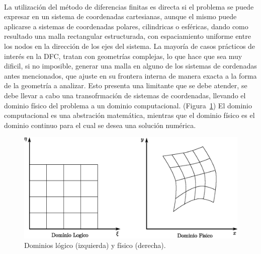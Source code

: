 \documentclass[letterpaper, openright, 12pt]{book}
\begin{document}
    \paragraph*{}
    La utilización del método de diferencias finitas es directa si el problema
    se puede expresar en un sistema de coordenadas cartesianas, aunque el mismo
    puede aplicarse a sistemas de coordenadas polares, cilindricas o esféricas,
    dando como resultado una malla rectangular estructurada, con espaciamiento
    uniforme entre los nodos en la dirección de los ejes del sistema. La mayoría
    de casos prácticos de interés en la DFC, tratan con geometrías complejas,
    lo que hace que sea muy dificil, si no imposible, generar una malla en
    alguno de los sistemas de cordenadas antes mencionados, que ajuste en su
    frontera interna de manera exacta a la forma de la geometría a analizar.
    Esto presenta una limitante que se debe atender, se debe llevar a cabo una
    transofrmación de sistemas de coordenadas, llevando el dominio físico del
    problema a un dominio computacional. (Figura~\ref{fig:dominios}) El dominio
    computacional es una abstración matemática, mientras que el dominio físico
    es el dominio continuo para el cual se desea una solución numérica.
    \begin{figure}[htbp!]
        \centering
        \includegraphics[keepaspectratio, width=170mm]{./img/dominios}
        \caption[Dominios lógico y físico]{Dominios lógico (izquierda) y físico (derecha). \cite{numerical-grid}}
        \label{fig:dominios}
    \end{figure}
\end{document}
